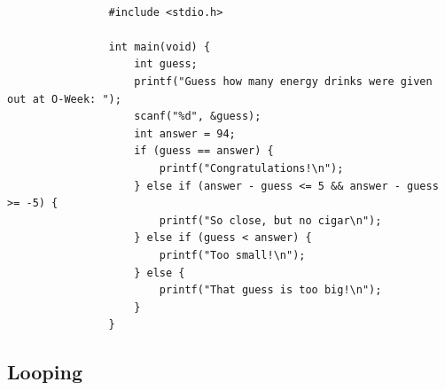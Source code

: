 \documentclass{article}
\begin{document}
			\begin{verbatim}

				#include <stdio.h>

				int main(void) {
					int guess;
					printf("Guess how many energy drinks were given out at O-Week: ");
					scanf("%d", &guess);
					int answer = 94;
					if (guess == answer) {
						printf("Congratulations!\n");
					} else if (answer - guess <= 5 && answer - guess >= -5) {
						printf("So close, but no cigar\n");
					} else if (guess < answer) {
						printf("Too small!\n");
					} else {
						printf("That guess is too big!\n");
					}
				}

			\end{verbatim}

	\subsection{Looping}
\end{document}
